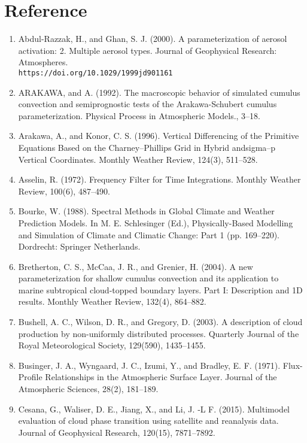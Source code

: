 \section{Reference}
\begin{enumerate}
\setlength{\parskip}{0pt} %
\setlength{\itemsep}{5pt} %
\setlength{\leftskip}{0pt} %
\item Abdul-Razzak, H., and Ghan, S. J. (2000). A parameterization of aerosol activation: 2. Multiple aerosol types. Journal of Geophysical Research: Atmospheres. \\
\texttt{https://doi.org/10.1029/1999jd901161}
\item ARAKAWA, and A. (1992). The macroscopic behavior of simulated cumulus convection and semiprognostic tests of the Arakawa-Schubert cumulus parameterization. Physical Process in Atmospheric Models., 3–18.
\item Arakawa, A., and Konor, C. S. (1996). Vertical Differencing of the Primitive Equations Based on the Charney–Phillips Grid in Hybrid andsigma–p Vertical Coordinates. Monthly Weather Review, 124(3), 511–528.
\item Asselin, R. (1972). Frequency Filter for Time Integrations. Monthly Weather Review, 100(6), 487–490.
\item Bourke, W. (1988). Spectral Methods in Global Climate and Weather Prediction Models. In M. E. Schlesinger (Ed.), Physically-Based Modelling and Simulation of Climate and Climatic Change: Part 1 (pp. 169–220). Dordrecht: Springer Netherlands.
\item Bretherton, C. S., McCaa, J. R., and Grenier, H. (2004). A new parameterization for shallow cumulus convection and its application to marine subtropical cloud-topped boundary layers. Part I: Description and 1D results. Monthly Weather Review, 132(4), 864–882.
\item Bushell, A. C., Wilson, D. R., and Gregory, D. (2003). A description of cloud production by non-uniformly distributed processes. Quarterly Journal of the Royal Meteorological Society, 129(590), 1435–1455.
\item Businger, J. A., Wyngaard, J. C., Izumi, Y., and Bradley, E. F. (1971). Flux-Profile Relationships in the Atmospheric Surface Layer. Journal of the Atmospheric Sciences, 28(2), 181–189.
\item Cesana, G., Waliser, D. E., Jiang, X., and Li, J. ‐L F. (2015). Multimodel evaluation of cloud phase transition using satellite and reanalysis data. Journal of Geophysical Research, 120(15), 7871–7892.

\end{enumerate}
